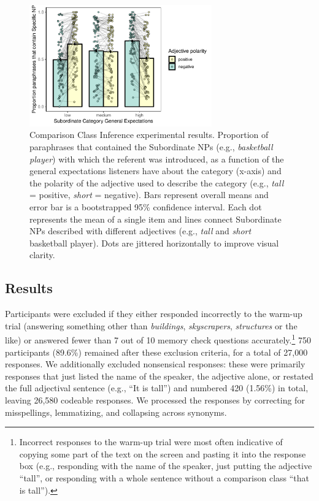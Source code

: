 \documentclass[doc]{apa6}
\begin{document}
\begin{figure}[t!]
\centering
\includegraphics[width=0.7\textwidth]{figs/bars_cc_finalExpt_prereg_bars_syncDodge.pdf}
\caption{Comparison Class Inference experimental results. Proportion of paraphrases that contained the Subordinate NPs (e.g., \emph{basketball player}) with which the referent was introduced, as a function of the general expectations listeners have about the category (x-axis) and the polarity of the adjective used to describe the category (e.g., \emph{tall} = positive, \emph{short} = negative). Bars represent overall means and error bar is a bootstrapped 95\% confidence interval. Each dot represents the mean of a single item and lines connect Subordinate NPs described with different adjectives (e.g., \emph{tall} and \emph{short} basketball player). Dots are jittered horizontally to improve visual clarity.}\label{fig:ccInferenceItems}
\end{figure}

\subsection{Results}

Participants were excluded if they either responded incorrectly to the warm-up trial (answering something other than \emph{buildings}, \emph{skyscrapers}, \emph{structures} or the like) or answered fewer than 7 out of 10 memory check questions accurately.\footnote{Incorrect responses to the warm-up trial were most often indicative of copying some part of the text on the screen and pasting it into the response box (e.g., responding with the name of the speaker, just putting the adjective ``tall'', or responding with a whole sentence without a comparison class ``that is tall'').}
750 participants (89.6\%) remained after these exclusion criteria, for a total of 27,000 responses.
We additionally excluded nonsensical responses: these were primarily responses that just listed the name of the speaker, the adjective alone, or restated the full adjectival sentence (e.g., ``It is tall'') and numbered 420 (1.56\%) in total, leaving 26,580 codeable responses. 
We processed the responses by correcting for misspellings, lemmatizing, and collapsing across synonyms. 
\end{document}
